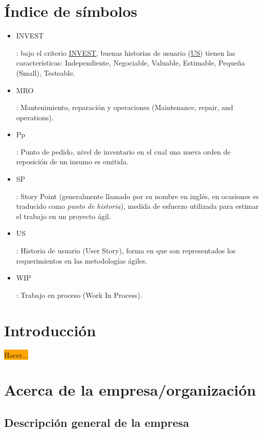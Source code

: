 \documentclass[a4paper, 12pt,twoside]{report}  %
\numberwithin{equation}{subsection} %
\begin{document}
\chapter*{Índice de símbolos}
\begin{itemize}
\item \hypertarget{INVEST}{INVEST}: bajo el criterio \hyperlink{INVEST}{INVEST}, buenas historias de usuario (\hyperlink{US}{US}) tienen las características: Independiente, Negociable, Valuable, Estimable, Pequeña (Small), Testeable.
\item \hypertarget{MRO}{MRO}: Mantenimiento, reparación y operaciones (Maintenance, repair, and operations).
\item \hypertarget{Pp}{Pp}: Punto de pedido, nivel de inventario en el cual una nueva orden de reposición de un insumo es emitida.
\item \hypertarget{SP}{SP}: Story Point (generalmente llamado por su nombre en inglés, en ocasiones es traducido como \textit{punto de historia}), medida de esfuerzo utilizada para estimar el trabajo en un proyecto ágil.
\item \hypertarget{US}{US}: Historia de usuario (User Story), forma en que son representados los requerimientos en las metodologías ágiles.
\item \hypertarget{WIP}{WIP}: Trabajo en proceso (Work In Process).
\end{itemize}

\renewcommand{\listfigurename}{Índice de figuras}
\listoffigures
{}

\renewcommand{\listtablename}{Índice de tablas}
\listoftables
{}

\clearpage

\chapter{Introducción}
\indent\colorbox{orange}{Hacer...}

\chapter{Acerca de la empresa/organización}
\section{Descripción general de la empresa}
\end{document}
